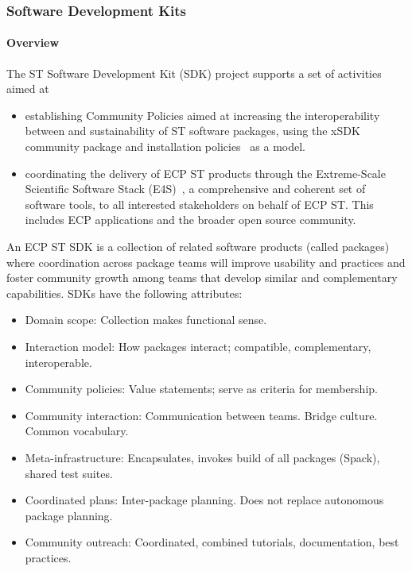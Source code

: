 \subsubsection{ Software Development Kits} \label{subsubsect:ecosystem-sdk}

\paragraph{Overview} The ST Software Development Kit (SDK) project supports a set of activities aimed at

\begin{itemize}
\item establishing Community Policies aimed at increasing the interoperability between and sustainability of ST software packages, using the xSDK~\cite{xsdk:homepage} community package and installation policies~\cite{xsdk-policies:homepage} as a model.

\item coordinating the delivery of ECP ST products through the Extreme-Scale Scientific Software Stack (E4S)~\cite{e4s:homepage}, a comprehensive and coherent set of software tools, to all interested stakeholders on behalf of ECP ST. This includes ECP applications and the broader open source community.
\end{itemize}

An ECP ST SDK is a collection of related software products (called packages) where coordination across package teams will improve usability and practices and foster community growth among teams that develop similar and complementary capabilities.  SDKs have the following attributes:
\begin{itemize}
\item Domain scope: Collection makes functional sense.
\item Interaction model: How packages interact; compatible, complementary, interoperable.
\item Community policies: Value statements; serve as criteria for membership.
\item Community interaction: Communication between teams. Bridge culture. Common vocabulary.
\item Meta-infrastructure: Encapsulates, invokes build of all packages (Spack), shared test suites.
\item Coordinated plans: Inter-package planning. Does not replace autonomous package planning.
\item Community outreach: Coordinated, combined tutorials, documentation, best practices.
\end{itemize}

